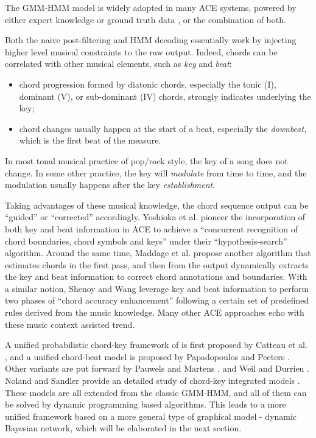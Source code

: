The GMM-HMM model is widely adopted in many ACE systems, powered by either expert knowledge \cite{bello2005robust,weil2008hmm,cannam2013mirex} or ground truth data \cite{ellis20072007,lee2008acoustic,weil2009automatic,khadkevich2009use,mauch2008discrete,reed2009minimum,cho2009real}, or the combination of both.

Both the naive post-filtering and HMM decoding essentially work by injecting higher level musical constraints to the raw output. Indeed, chords can be correlated with other musical elements, such as {\it key} and {\it beat}:
\begin{itemize}
\item chord progression formed by diatonic chords, especially the tonic (I), dominant (V), or sub-dominant (IV) chords, strongly indicates underlying the key;
\item chord changes usually happen at the start of a beat, especially the {\it downbeat}, which is the first beat of the measure.
\end{itemize}
In most tonal musical practice of pop/rock style, the key of a song does not change. In some other practice, the key will {\it modulate} from time to time, and the modulation usually happens after the key {\it establishment}.

Taking advantages of these musical knowledge, the chord sequence output can be ``guided'' or ``corrected'' accordingly. Yoshioka et al. \cite{yoshioka2004automatic} pioneer the incorporation of both key and beat information in ACE to achieve a ``concurrent recognition of chord boundaries, chord symbols and keys'' under their ``hypothesis-search'' algorithm. Around the same time, Maddage et al. \cite{maddage2004content} propose another algorithm that estimates chords in the first pass, and then from the output dynamically extracts the key and beat information to correct chord annotations and boundaries. With a similar notion, Shenoy and Wang \cite{shenoy2005key} leverage key and beat information to perform two phases of ``chord accuracy enhancement'' following a certain set of predefined rules derived from the music knowledge. Many other ACE approaches \cite{lee2008acoustic,zenz2007automatic,sumi2008automatic,reinhard2008enhancing,khadkevich2011time} echo with these music context assisted trend.

A unified probabilistic chord-key framework of is first proposed by Catteau et al. \cite{catteau2007probabilistic}, and a unified chord-beat model is proposed by Papadopoulos and Peeters \cite{papadopoulos2008simultaneous}. Other variants are put forward by Pauwels and Martens \cite{pauwels2010integrating,pauwels2014combining}, and Weil and Durrieu \cite{weil2009automatic}. Noland and Sandler provide an detailed study of chord-key integrated models \cite{noland2009influences}. These models are all extended from the classic GMM-HMM, and all of them can be solved by dynamic programming based algorithms. This leads to a more unified framework based on a more general type of graphical model - dynamic Bayesian network, which will be elaborated in the next section.

